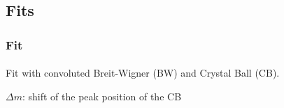 \subsection{Fits}
\color{titlecolor}
\begin{frame}
  \frametitle{Fit \Zee}

  \framesubtitle{}
  \vspace{10mm}
	Fit with convoluted Breit-Wigner (BW) and Crystal Ball (CB).

  \bl
  $\Delta m$: shift of the peak position of the CB
  

  \dualslide{
  }{  
  }

  \bl
  \centering    \dataSample\xspace \invMassVarName

  
  \begin{block}{}
  \end{block}

\end{frame}


